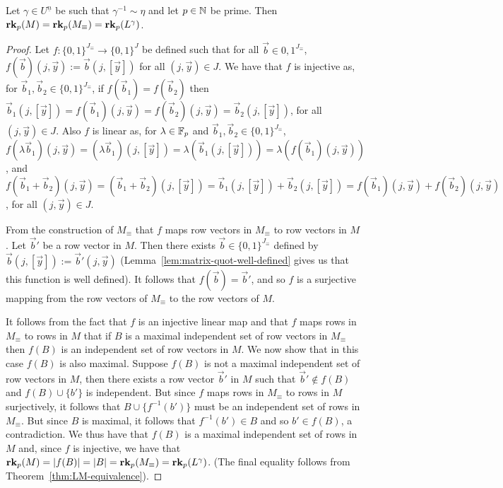 \documentclass[../main/thesis.tex]{subfiles}
\begin{document}
\begin{lem}
	Let $\gamma \in U^{\underline{n}}$ be such that $\gamma^{-1} \sim \eta$ and
  let $p \in \mathbb{N}$ be prime. Then $\text{\textbf{rk}}_p (M) = \text{\textbf{rk}}_p (M_\equiv) = \text{\textbf{rk}}_p
  (L^{\gamma})$.
  \label{lem:rank-triple-equivilence}
\end{lem}
\begin{proof}
	Let $f : \{0,1\}^{J_\equiv} \rightarrow \{0,1\}^{J}$ be defined such that for
  all $\vec{b} \in {0,1}^{J_\equiv}$, $f(\vec{b}) (j, \vec{y}) := \vec{b}(j,
  [\vec{y}])$ for all $(j, \vec{y}) \in J$. We have that $f$ is injective as,
  for $\vec{b}_1, \vec{b}_2 \in \{0,1\}^{J_\equiv}$, if $f(\vec{b}_1) =
  f(\vec{b}_2)$ then $\vec{b}_1 (j, [\vec{y}]) = f(\vec{b}_1)(j, \vec{y}) =
  f(\vec{b}_2)(j, \vec{y}) = \vec{b}_2(j, [\vec{y}])$, for all $(j, \vec{y}) \in
  J$. Also $f$ is linear as, for $\lambda \in \mathbb{F}_p$ and $\vec{b}_1, \vec{b}_2
  \in \{0,1\}^{J_\equiv}$, $f(\lambda \vec{b}_1) (j, \vec{y}) = (\lambda
  \vec{b}_1)(j, [\vec{y}]) = \lambda (\vec{b}_1 (j, [\vec{y}])) = \lambda (f(
  \vec{b}_1) (j, \vec{y}))$, and $ f(\vec{b}_1 + \vec{b}_2) (j, \vec{y}) =
  (\vec{b}_1 + \vec{b}_2) (j, [\vec{y}]) = \vec{b}_1(j, [\vec{y}]) +
  \vec{b}_2(j, [\vec{y}]) = f(\vec{b}_1)(j, \vec{y}) + f(\vec{b}_2)(j,
  \vec{y})$, for all $(j, \vec{y}) \in J$.
		
	From the construction of $M_\equiv$ that $f$ maps row vectors in $M_\equiv$ to
  row vectors in $M$. Let $\vec{b}'$ be a row vector in $M$. Then there exists
  $\vec{b} \in \{0,1\}^{J_\equiv}$ defined by $\vec{b} (j, [\vec{y}]) :=
  \vec{b}' (j, \vec{y})$ (Lemma~\ref{lem:matrix-quot-well-defined} gives us that
  this function is well defined). It follows that $f(\vec{b}) = \vec{b}'$, and
  so $f$ is a surjective mapping from the row vectors of $M_\equiv$ to the row
  vectors of $M$.
		
	It follows from the fact that $f$ is an injective linear map and that $f$ maps
  rows in $M_\equiv$ to rows in $M$ that if $B$ is a maximal independent set of
  row vectors in $M_\equiv$ then $f(B)$ is an independent set of row vectors in
  $M$. We now show that in this case $f(B)$ is also maximal. Suppose $f(B)$ is
  not a maximal independent set of row vectors in $M$, then there exists a row
  vector $\vec{b}'$ in $M$ such that $\vec{b}' \notin f(B)$ and $f(B) \cup
  \{b'\}$ is independent. But since $f$ maps rows in $M_\equiv$ to rows in $M$
  surjectively, it follows that $B \cup \{f^{-1}(b') \}$ must be an independent
  set of rows in $M_\equiv$. But since $B$ is maximal, it follows that
  $f^{-1}(b') \in B$ and so $b' \in f(B)$, a contradiction. We thus have that
  $f(B)$ is a maximal independent set of rows in $M$ and, since $f$ is
  injective, we have that $\text{\textbf{rk}}_p (M) = \vert f(B) \vert = \vert B \vert =
  \text{\textbf{rk}}_p (M_\equiv) = \text{\textbf{rk}}_p(L^{\gamma})$. (The final equality follows from
  Theorem~\ref{thm:LM-equivalence}).
\end{proof}
\end{document}
